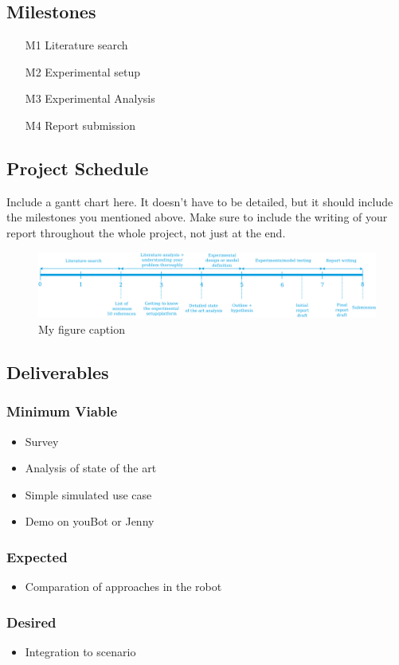 \documentclass[rnd]{mas_proposal}
\begin{document}
\subsection{Milestones}
\begin{enumerate}
    \item[M1] Literature search
    \item[M2] Experimental setup
    \item[M3] Experimental Analysis
    \item[M4] Report submission
\end{enumerate}

\subsection{Project Schedule}
Include a gantt chart here. It doesn't have to be detailed, but it should include the milestones you mentioned above.
Make sure to include the writing of your report throughout the whole project, not just at the end.

\begin{figure}[h!]
    \includegraphics[width=\textwidth]{images/rnd_deliverable_timeline}
    \caption{My figure caption}
    \label{fig:myfigure}
\end{figure}

\subsection{Deliverables}
\subsubsection*{Minimum Viable}

\begin{itemize}
    \item Survey
    \item Analysis of state of the art
    \item Simple simulated use case
    \item Demo on youBot or Jenny
\end{itemize}

\subsubsection*{Expected}
\begin{itemize}
    \item Comparation of approaches in the robot
\end{itemize}

\subsubsection*{Desired}
\begin{itemize}
    \item Integration to scenario
\end{itemize}


\nocite{*}

\end{document}
